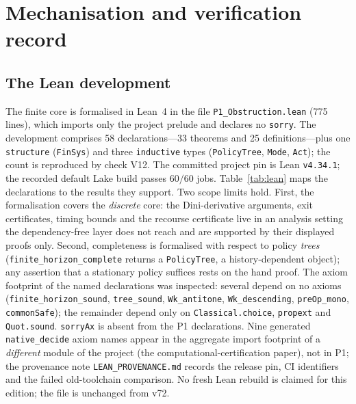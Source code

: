 \section{Mechanisation and verification record}\label{S:verification}

\subsection{The Lean development}\label{S:lean}
The finite core is formalised in Lean~4 in the file \texttt{P1\_Obstruction.lean} (775 lines), which imports only the project prelude and declares no \texttt{sorry}. The development comprises 58 declarations---33 theorems and 25 definitions---plus one \texttt{structure} (\texttt{FinSys}) and three \texttt{inductive} types (\texttt{PolicyTree}, \texttt{Mode}, \texttt{Act}); the count is reproduced by check V12. The committed project pin is Lean \texttt{v4.34.1}; the recorded default Lake build passes $60/60$ jobs. Table~\ref{tab:lean} maps the declarations to the results they support. Two scope limits hold. First, the formalisation covers the \emph{discrete} core: the Dini-derivative arguments, exit certificates, timing bounds and the recourse certificate live in an analysis setting the dependency-free layer does not reach and are supported by their displayed proofs only. Second, completeness is formalised with respect to policy \emph{trees} (\texttt{finite\_horizon\_complete} returns a \texttt{PolicyTree}, a history-dependent object); any assertion that a stationary policy suffices rests on the hand proof. The axiom footprint of the named declarations was inspected: several depend on no axioms (\texttt{finite\_horizon\_sound}, \texttt{tree\_sound}, \texttt{Wk\_antitone}, \texttt{Wk\_descending}, \texttt{preOp\_mono}, \texttt{commonSafe}); the remainder depend only on \texttt{Classical.choice}, \texttt{propext} and \texttt{Quot.sound}. \texttt{sorryAx} is absent from the P1 declarations. Nine generated \texttt{native\_decide} axiom names appear in the aggregate import footprint of a \emph{different} module of the project (the computational-certification paper), not in P1; the provenance note \texttt{LEAN\_PROVENANCE.md} records the release pin, CI identifiers and the failed old-toolchain comparison. No fresh Lean rebuild is claimed for this edition; the file is unchanged from v72.

